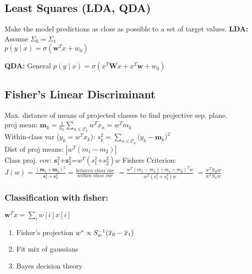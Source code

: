 \subsection{Least Squares (LDA, QDA)}
Make the model predictions as close as possible to a set of target values.
\textbf{LDA:} Assume $\Sigma_0 = \Sigma_1$\\ $p(y\mid x) = \sigma(\mathbf w^Tx + w_0)$

\textbf{QDA:} General	$p(y\mid x) = \sigma(x^T\mathbf Wx + x^T\mathbf w + w_0)$ 



\subsection{Fisher's Linear Discriminant}
Max. distance of means of projected classes to find projective sep. plane.\\
proj mean: $\mathbf m_k{=}\frac{1}{n_k}\sum_{n\in \mathcal C_k}w^Tx_n{=}w^Tm_k$\\
Within-class var ($y_k = w^Tx_k$): $s_k^2 = \sum_{n\in \mathcal C_k}\mathbf (y_k - \mathbf m_k)^2$\\
Dist of proj means: $|w^T(m_1-m_2)|$ \\
Class proj. cov: $\mathbf s^2_1\text{+}\mathbf s^2_2\text{=}w^T(s^2_1\text{+}s^2_2)w$\sepline
Fishers Criterion:\\
$J(w)=\frac{(\mathbf m_1 + \mathbf m_2)^2}{\mathbf s^2_1{+}\mathbf s^2_2} = \frac{\textit{between class var}}{\textit{within class var}}$ $=\frac{w^T(m_1-m_2)(m_1-m_2)^Tw}{w^T(s^2_1{+}s^2_2)w}$
$ = \frac{w^TS_Bw}{w^TS_ww}$



\subsubsection{Classification with fisher: } $\mathbf w^Tx = \sum_iw[i]x[i]$
\begin{enumerate}
	\item Fisher's projection $w^* \propto S_w^{-1}(\overline{x}_0 - \overline{x}_1)$
	\item Fit mix of gaussians
	\item Bayes decision theory
\end{enumerate}


